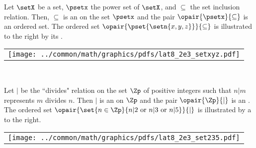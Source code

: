 \begin{minipage}{\tw-43mm}\raggedright%
\begin{example}
\label{ex:poset_xyz}
\footnotemark
Let $\setX$ be a set, $\psetx$ the power set of $\setX$,
and $\subseteq$ the set inclusion relation.
Then, $\subseteq$ is an  on the set $\psetx$
and the pair $\opair{\psetx}{\subseteq}$ is an ordered set.
The ordered set $\opair{\pset{\setn{x,y,z}}}{\subseteq}$ is illustrated 
to the right by its .
\end{example}%
\end{minipage}%
%
\hfill\begin{tabular}{c}\texttt{[image: ../common/math/graphics/pdfs/lat8\_2e3\_setxyz.pdf]}\end{tabular}\hfill\mbox{}\\%

\begin{minipage}{\tw-43mm}%
\begin{example}%
\label{ex:poset_532}
\footnotemark
Let $|$ be the ``divides" relation on the set $\Zp$ of positive integers such that
$n|m$ represents $m$ divides $n$.
Then $|$ is an  on $\Zp$
and the pair $\opair{\Zp}{|}$ is an .
The ordered set
$\opair{\set{n\in\Zp}{n|2 \text{ or } n|3 \text{ or } n|5}}{|}$
is illustrated by a  to the right.
\end{example}%
\end{minipage}%
%
\hfill\begin{tabular}{c}\texttt{[image: ../common/math/graphics/pdfs/lat8\_2e3\_set235.pdf]}\end{tabular}\hfill\mbox{}\\%

